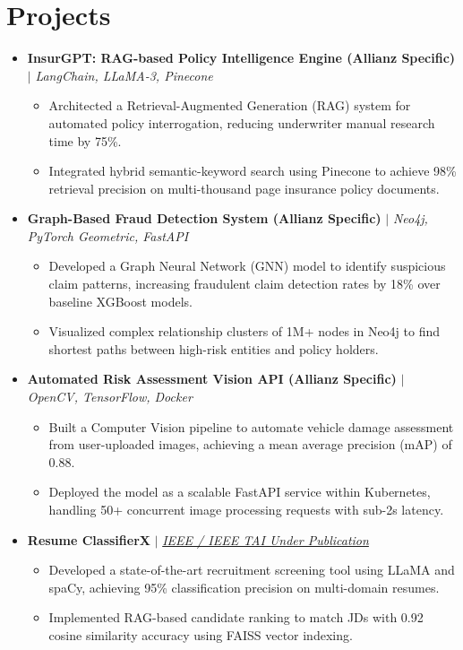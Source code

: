 \documentclass[10pt,a4paper]{article}
\newcommand{\resumeItem}[1]{\item\small{#1}}
\begin{document}
\section{Projects}
\begin{itemize}[label={}]
    \item \textbf{InsurGPT: RAG-based Policy Intelligence Engine (Allianz Specific)} $|$ \emph{LangChain, LLaMA-3, Pinecone}
    \begin{itemize}
        \resumeItem{Architected a Retrieval-Augmented Generation (RAG) system for automated policy interrogation, reducing underwriter manual research time by 75\%.}
        \resumeItem{Integrated hybrid semantic-keyword search using Pinecone to achieve 98\% retrieval precision on multi-thousand page insurance policy documents.}
    \end{itemize}

    \item \textbf{Graph-Based Fraud Detection System (Allianz Specific)} $|$ \emph{Neo4j, PyTorch Geometric, FastAPI}
    \begin{itemize}
        \resumeItem{Developed a Graph Neural Network (GNN) model to identify suspicious claim patterns, increasing fraudulent claim detection rates by 18\% over baseline XGBoost models.}
        \resumeItem{Visualized complex relationship clusters of 1M+ nodes in Neo4j to find shortest paths between high-risk entities and policy holders.}
    \end{itemize}

    \item \textbf{Automated Risk Assessment Vision API (Allianz Specific)} $|$ \emph{OpenCV, TensorFlow, Docker}
    \begin{itemize}
        \resumeItem{Built a Computer Vision pipeline to automate vehicle damage assessment from user-uploaded images, achieving a mean average precision (mAP) of 0.88.}
        \resumeItem{Deployed the model as a scalable FastAPI service within Kubernetes, handling 50+ concurrent image processing requests with sub-2s latency.}
    \end{itemize}

    \item \textbf{Resume ClassifierX} $|$ \emph{\href{https://github.com/KartavyaDikshit/Resume-ClassifierX}{IEEE / IEEE TAI Under Publication}}
    \begin{itemize}
        \resumeItem{Developed a state-of-the-art recruitment screening tool using LLaMA and spaCy, achieving 95\% classification precision on multi-domain resumes.}
        \resumeItem{Implemented RAG-based candidate ranking to match JDs with 0.92 cosine similarity accuracy using FAISS vector indexing.}
    \end{itemize}


\end{itemize}
\end{document}
